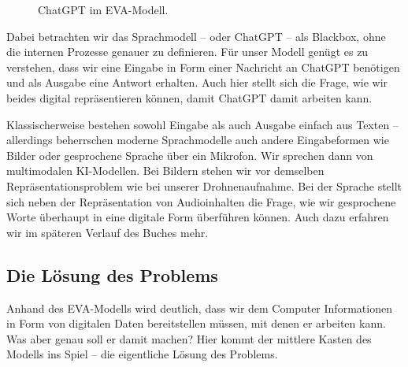 \documentclass[
  ngerman,
  letterpaper,
  DIV=11]{scrreprt}
\begin{document}
\begin{figure}


\caption{\label{fig-eva-model-example-chatgpt}ChatGPT im EVA-Modell.}

\end{figure}%

Dabei betrachten wir das Sprachmodell -- oder ChatGPT -- als Blackbox,
ohne die internen Prozesse genauer zu definieren. Für unser Modell
genügt es zu verstehen, dass wir eine Eingabe in Form einer Nachricht an
ChatGPT benötigen und als Ausgabe eine Antwort erhalten. Auch hier
stellt sich die Frage, wie wir beides digital repräsentieren können,
damit ChatGPT damit arbeiten kann.

Klassischerweise bestehen sowohl Eingabe als auch Ausgabe einfach aus
Texten -- allerdings beherrschen moderne Sprachmodelle auch andere
Eingabeformen wie Bilder oder gesprochene Sprache über ein Mikrofon. Wir
sprechen dann von multimodalen KI-Modellen. Bei Bildern stehen wir vor
demselben Repräsentationsproblem wie bei unserer Drohnenaufnahme. Bei
der Sprache stellt sich neben der Repräsentation von Audioinhalten die
Frage, wie wir gesprochene Worte überhaupt in eine digitale Form
überführen können. Auch dazu erfahren wir im späteren Verlauf des Buches
mehr.

\subsection{Die Lösung des Problems}\label{die-luxf6sung-des-problems}

Anhand des EVA-Modells wird deutlich, dass wir dem Computer
Informationen in Form von digitalen Daten bereitstellen müssen, mit
denen er arbeiten kann. Was aber genau soll er damit machen? Hier kommt
der mittlere Kasten des Modells ins Spiel -- die eigentliche Lösung des
Problems.
\end{document}
